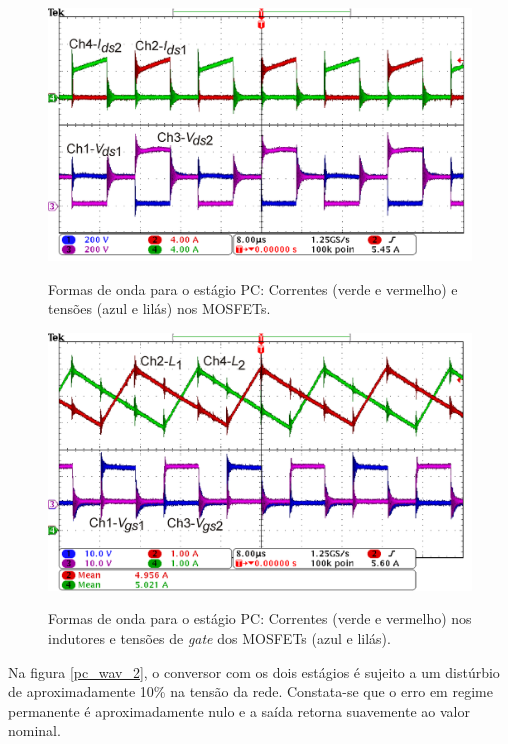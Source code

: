 \documentclass[
        12pt,
        openany, %
        oneside, %
        a4paper,			
        english,			
        brazil
        ]{abntbibufjf}
\begin{document}
\begin{figure}[!h]
	\centering
	\caption{Formas de onda para o estágio PC: Correntes (verde e vermelho) e tensões (azul e lilás) nos MOSFETs.}
	\includegraphics[width=0.7\linewidth]{../FIGURAS/Figuras_TFC_Eric/Formas_de_onda/MOSFETs_EGIBC}
	\label{pc_wav_1}
\end{figure}

\begin{figure}[!h]
	\centering
	\caption{Formas de onda para o estágio PC: Correntes (verde e vermelho) nos indutores e tensões de \textit{gate} dos MOSFETs (azul e lilás).}
	\includegraphics[width=0.7\linewidth]{../FIGURAS/Figuras_TFC_Eric/Formas_de_onda/Inductors_EGIBC}
	\label{pc_wav_88}
\end{figure}

Na figura \ref{pc_wav_2}, o conversor com os dois estágios é sujeito a um distúrbio de aproximadamente 10\% na tensão da rede. Constata-se que o erro em regime permanente é aproximadamente nulo e a saída retorna suavemente ao valor nominal.
\end{document}
